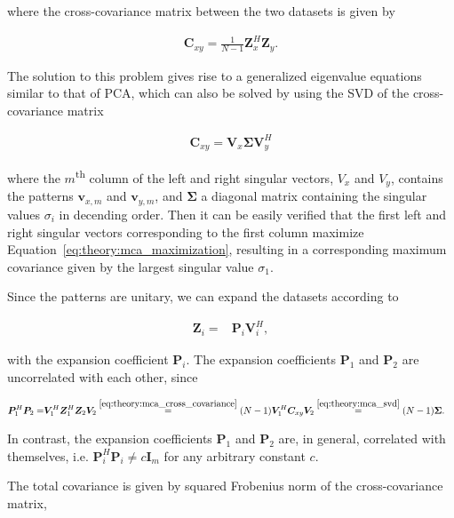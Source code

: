 where the cross-covariance matrix between the two datasets is given by

\begin{align}\label{eq:theory:mca_cross_covariance}
    \bm{C}_{xy} = \frac{1}{N-1} \bm{Z}_x^H \bm{Z}_y.
\end{align}

The solution to this problem gives rise to a generalized eigenvalue equations similar to that of PCA, which can also be solved by using the SVD of the cross-covariance matrix

\begin{align}\label{eq:theory:mca_svd}
    \bm{C}_{xy} = \bm{V}_x \bm{\Sigma} \bm{V}_y^H
\end{align}


where the $m$\textsuperscript{th} column of the left and right singular vectors, $V_x$ and $V_y$, contains the patterns $\bm{v}_{x,m}$ and $\bm{v}_{y,m}$, and $\bm{\Sigma}$ a diagonal matrix containing the singular values $\sigma_i$ in decending order. Then it can be easily verified that the first left and right singular vectors corresponding to the first column maximize Equation~\eqref{eq:theory:mca_maximization}, resulting in a corresponding maximum covariance given by the largest singular value $\sigma_1$.

Since the patterns are unitary, we can expand the datasets according to

\begin{align}
    \bm{Z}_i =& \bm{P}_i \bm{V}_i^H,
\end{align}

with the expansion coefficient $\bm{P}_i$. The expansion coefficients $\bm{P}_1$ and $\bm{P}_2$ are uncorrelated with each other, since

\begin{align}
    \bm{P}_1^H \bm{P}_2 =& \bm{V}_1^H \bm{Z}_1^H \bm{Z}_2 \bm{V}_2 \overset{\eqref{eq:theory:mca_cross_covariance}}{=} (N-1) \bm{V}_1^H \bm{C}_{xy} \bm{V}_2 \overset{\eqref{eq:theory:mca_svd}}{=} (N-1)\bm{\Sigma}.
\end{align}

In contrast, the expansion coefficients $\bm{P}_1$ and $\bm{P}_2$ are, in general, correlated with themselves, i.e. $\bm{P}_i^H\bm{P}_i \neq c \bm{I}_m$ for any arbitrary constant $c$.

The total covariance is given by squared Frobenius norm of the cross-covariance matrix, 

